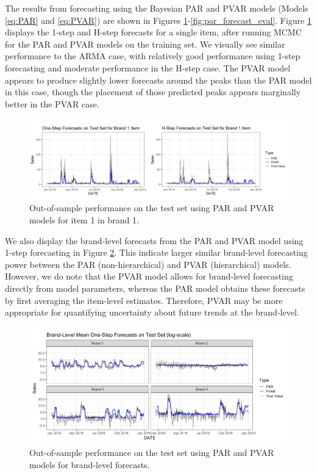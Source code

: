 \documentclass{article}
\begin{document}
\noindent The results from forecasting using the Bayesian PAR and PVAR models (Models \ref{eq:PAR} and \ref{eq:PVAR}) are shown in Figures \ref{fig:parpred}-\ref{fig:par_forecast_eval}. Figure \ref{fig:parpred} displays the 1-step and H-step forecasts for a single item, after running MCMC for the PAR and PVAR models on the training set. We visually see similar performance to the ARMA case, with relatively good performance using 1-step forecasting and moderate performance in the H-step case. The PVAR model appears to produce slightly lower forecasts around the peaks than the PAR model in this case, though the placement of those predicted peaks appears marginally better in the PVAR case. \\

\vspace{4cm}

\begin{figure}[ht]
\centering
\includegraphics[width=1\linewidth]{figures/PAR_forecast.png}
\caption{Out-of-sample performance on the test set using PAR and PVAR models for item 1 in brand 1.}
\label{fig:parpred}
\end{figure}

\noindent We also display the brand-level forecasts from the PAR and PVAR model using 1-step forecasting in Figure \ref{fig:parpred_brand}. This indicate larger similar brand-level forecasting power between the PAR (non-hierarchical) and PVAR (hierarchical) models. However, we do note that the PVAR model allows for brand-level forecasting directly from model parameters, whereas the PAR model obtains these forecasts by first averaging the item-level estimates. Therefore, PVAR may be more appropriate for quantifying uncertainty about future trends at the brand-level.

\begin{figure}[ht]
\centering
\includegraphics[width=1\textwidth]{figures/PAR_forecast_brand.png}
\caption{Out-of-sample performance on the test set using PAR and PVAR models for brand-level forecasts.}
\label{fig:parpred_brand}
\end{figure}
\end{document}
